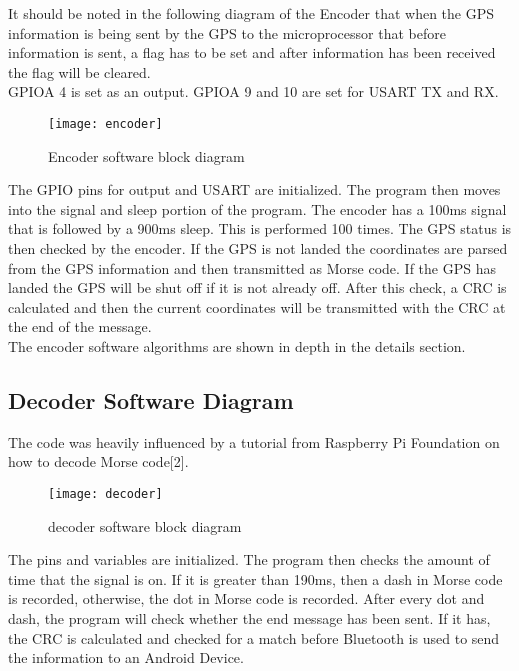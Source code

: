 \documentclass[12pt, letterpaper]{article}
\begin{document}
It should be noted in the following diagram of the Encoder that when the GPS information is being sent by the GPS to the microprocessor that before information is sent, a flag has to be set and after information has been received the flag will be cleared. \\

GPIOA 4 is set as an output. GPIOA 9 and 10 are set for USART TX and RX.

\begin{figure}[H]
    \centering
    \texttt{[image: encoder]}
    \caption{Encoder software block diagram}
    \label{Ass1}
\end{figure}

The GPIO pins for output and USART are initialized. The program then moves into the signal and sleep portion of the program. The encoder has a 100ms signal that is followed by a 900ms sleep. This is performed 100 times. The GPS status is then checked by the encoder. If the GPS is not landed the coordinates are parsed from the GPS information and then transmitted as Morse code. If the GPS has landed the GPS will be shut off if it is not already off. After this check, a CRC is calculated and then the current coordinates will be transmitted with the CRC at the end of the message.\\

The encoder software algorithms are shown in depth in the details section. 

\subsection{Decoder Software Diagram}
The code was heavily influenced by a tutorial from Raspberry Pi Foundation on how to decode Morse code[2].

\begin{figure}[H]
    \centering
    \texttt{[image: decoder]}
    \caption{decoder software block diagram}
    \label{Ass2}
\end{figure}

The pins and variables are initialized. The program then checks the amount of time that the signal is on. If it is greater than 190ms, then a dash in Morse code is recorded, otherwise, the dot in Morse code is recorded. After every dot and dash, the program will check whether the end message has been sent. If it has, the CRC is calculated and checked for a match before Bluetooth is used to send the information to an Android Device.\\
\end{document}
